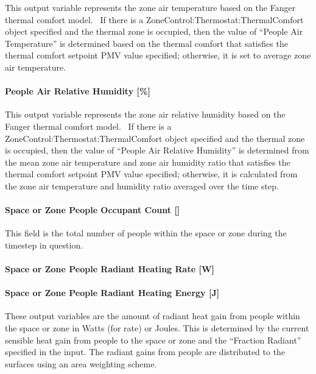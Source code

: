 This output variable represents the zone air temperature based on the Fanger thermal comfort model.~ If there is a ZoneControl:Thermostat:ThermalComfort object specified and the thermal zone is occupied, then the value of ``People Air Temperature'' is determined based on the thermal comfort that satisfies the thermal comfort setpoint PMV value specified; otherwise, it is set to average zone air temperature.

\paragraph{People Air Relative Humidity {[}\%{]}}\label{people-air-relative-humidity}

This output variable represents the zone air relative humidity based on the Fanger thermal comfort model.~ If there is a ZoneControl:Thermostat:ThermalComfort object specified and the thermal zone is occupied, then the value of ``People Air Relative Humidity'' is determined from the mean zone air temperature and zone air humidity ratio that satisfies the thermal comfort setpoint PMV value specified; otherwise, it is calculated from the zone air temperature and humidity ratio averaged over the time step.

\paragraph{Space or Zone People Occupant Count {[]}}\label{zone-people-occupant-count}

This field is the total number of people within the space or zone during the timestep in question.

\paragraph{Space or Zone People Radiant Heating Rate {[}W{]}}\label{zone-people-radiant-heating-rate-w}

\paragraph{Space or Zone People Radiant Heating Energy {[}J{]}}\label{zone-people-radiant-heating-energy-j}

These output variables are the amount of radiant heat gain from people within the space or zone in Watts (for rate) or Joules. This is determined by the current sensible heat gain from people to the space or zone and the ``Fraction Radiant'' specified in the input. The radiant gains from people are distributed to the surfaces using an area weighting scheme.

